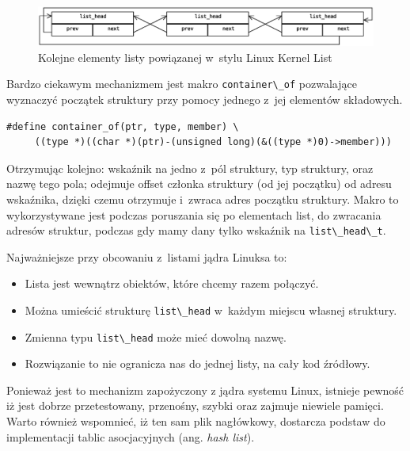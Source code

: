 \documentclass[a4paper,12pt,polish,twoside,openright]{thesis}
\newcommand\code[1]{\lstinline[style=line]{#1}}
\begin{document}
\begin{figure}[htb]
	\begin{center}
		\includegraphics[width=1.05\textwidth]{gfx/list_head.eps}
		\caption{Kolejne elementy listy powiązanej w~stylu Linux Kernel List}
	\end{center}
\end{figure}

Bardzo ciekawym mechanizmem jest makro \code{container\_of} pozwalające wyznaczyć początek struktury przy pomocy jednego z~jej elementów składowych.
\begin{lstlisting}[style=coden,caption=Definicja jednego z makr jądra linuksa: {container\_of}]
#define container_of(ptr, type, member) \
	 ((type *)((char *)(ptr)-(unsigned long)(&((type *)0)->member)))
\end{lstlisting}
Otrzymując kolejno: wskaźnik na jedno z~pól struktury, typ struktury, oraz nazwę tego pola; odejmuje offset członka struktury (od jej początku) od adresu wskaźnika, dzięki czemu otrzymuje i~zwraca adres początku struktury\cite{lkl2}.
Makro to wykorzystywane jest podczas poruszania się po elementach list, do zwracania adresów struktur, podczas gdy mamy dany tylko wskaźnik na \code{list\_head\_t}.

Najważniejsze przy obcowaniu z~listami jądra Linuksa to:
\begin{itemize}
	\item Lista jest wewnątrz obiektów, które chcemy razem połączyć.
	\item Można umieścić strukturę \code{list\_head} w~każdym miejscu własnej struktury.
	\item Zmienna typu \code{list\_head} może mieć dowolną nazwę.
	\item Rozwiązanie to nie ogranicza nas do jednej listy, na cały kod źródłowy.
\end{itemize}
Ponieważ jest to mechanizm zapożyczony z jądra systemu Linux, istnieje pewność iż jest dobrze przetestowany, przenośny, szybki oraz zajmuje niewiele pamięci.
Warto również wspomnieć, iż ten sam plik nagłówkowy, dostarcza podstaw do implementacji tablic asocjacyjnych (ang. \emph{hash list}).
\end{document}
